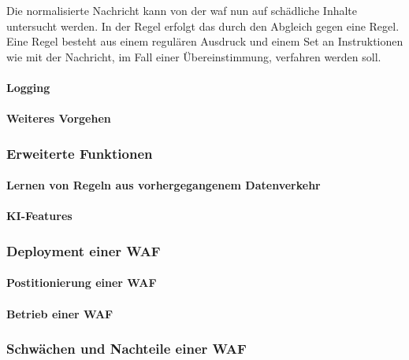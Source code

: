 Die normalisierte Nachricht kann von der \ac{waf} nun auf schädliche Inhalte untersucht werden.
In der Regel erfolgt das durch den Abgleich gegen eine Regel.
Eine Regel besteht aus einem regulären Ausdruck und einem Set an Instruktionen wie mit der Nachricht, im Fall einer Übereinstimmung, verfahren werden soll.


\paragraph{Logging}

\paragraph{Weiteres Vorgehen}
% 

\subsubsection{Erweiterte Funktionen}
\paragraph{Lernen von Regeln aus vorhergegangenem Datenverkehr}
\paragraph{KI-Features}
\subsubsection{Deployment einer WAF}
\paragraph{Postitionierung einer WAF}
\paragraph{Betrieb einer WAF}
\subsubsection{Schwächen und Nachteile einer WAF}

